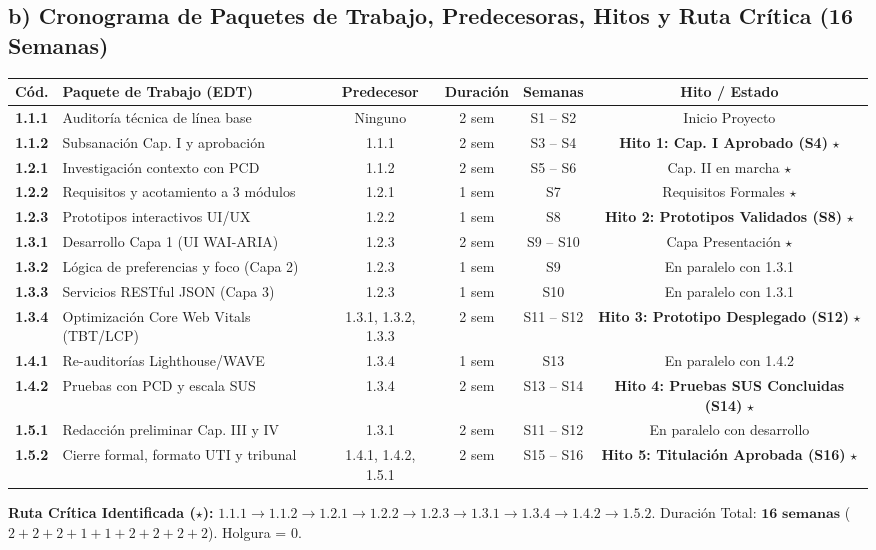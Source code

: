 \documentclass[10pt,a4paper]{article}
\begin{document}
\subsection*{\normalsize\color{utiNavy}b) Cronograma de Paquetes de Trabajo, Predecesoras, Hitos y Ruta Crítica (16 Semanas)}

\begin{center}
\footnotesize
\renewcommand{\arraystretch}{1.05}
\begin{tabularx}{\textwidth}{c X c c c c}
\toprule
\textbf{Cód.} & \textbf{Paquete de Trabajo (EDT)} & \textbf{Predecesor} & \textbf{Duración} & \textbf{Semanas} & \textbf{Hito / Estado} \\
\midrule
\textbf{1.1.1} & Auditoría técnica de línea base & Ninguno & 2 sem & S1 -- S2 & Inicio Proyecto \\
\textbf{1.1.2} & Subsanación Cap. I y aprobación & 1.1.1 & 2 sem & S3 -- S4 & \textbf{Hito 1: Cap. I Aprobado (S4)} $\star$ \\
\textbf{1.2.1} & Investigación contexto con PCD & 1.1.2 & 2 sem & S5 -- S6 & Cap. II en marcha $\star$ \\
\textbf{1.2.2} & Requisitos y acotamiento a 3 módulos & 1.2.1 & 1 sem & S7 & Requisitos Formales $\star$ \\
\textbf{1.2.3} & Prototipos interactivos UI/UX & 1.2.2 & 1 sem & S8 & \textbf{Hito 2: Prototipos Validados (S8)} $\star$ \\
\textbf{1.3.1} & Desarrollo Capa 1 (UI WAI-ARIA) & 1.2.3 & 2 sem & S9 -- S10 & Capa Presentación $\star$ \\
\textbf{1.3.2} & Lógica de preferencias y foco (Capa 2) & 1.2.3 & 1 sem & S9 & En paralelo con 1.3.1 \\
\textbf{1.3.3} & Servicios RESTful JSON (Capa 3) & 1.2.3 & 1 sem & S10 & En paralelo con 1.3.1 \\
\textbf{1.3.4} & Optimización Core Web Vitals (TBT/LCP) & 1.3.1, 1.3.2, 1.3.3 & 2 sem & S11 -- S12 & \textbf{Hito 3: Prototipo Desplegado (S12)} $\star$ \\
\textbf{1.4.1} & Re-auditorías Lighthouse/WAVE & 1.3.4 & 1 sem & S13 & En paralelo con 1.4.2 \\
\textbf{1.4.2} & Pruebas con PCD y escala SUS & 1.3.4 & 2 sem & S13 -- S14 & \textbf{Hito 4: Pruebas SUS Concluidas (S14)} $\star$ \\
\textbf{1.5.1} & Redacción preliminar Cap. III y IV & 1.3.1 & 2 sem & S11 -- S12 & En paralelo con desarrollo \\
\textbf{1.5.2} & Cierre formal, formato UTI y tribunal & 1.4.1, 1.4.2, 1.5.1 & 2 sem & S15 -- S16 & \textbf{Hito 5: Titulación Aprobada (S16)} $\star$ \\
\bottomrule
\end{tabularx}
\end{center}
\vspace{-0.2cm}
\noindent
\textbf{\color{criticalRed}Ruta Crítica Identificada ($\star$):} $\mathbf{1.1.1 \rightarrow 1.1.2 \rightarrow 1.2.1 \rightarrow 1.2.2 \rightarrow 1.2.3 \rightarrow 1.3.1 \rightarrow 1.3.4 \rightarrow 1.4.2 \rightarrow 1.5.2}$. Duración Total: $\mathbf{16\text{ semanas}}$ ($2+2+2+1+1+2+2+2+2$). Holgura = 0.
\end{document}
